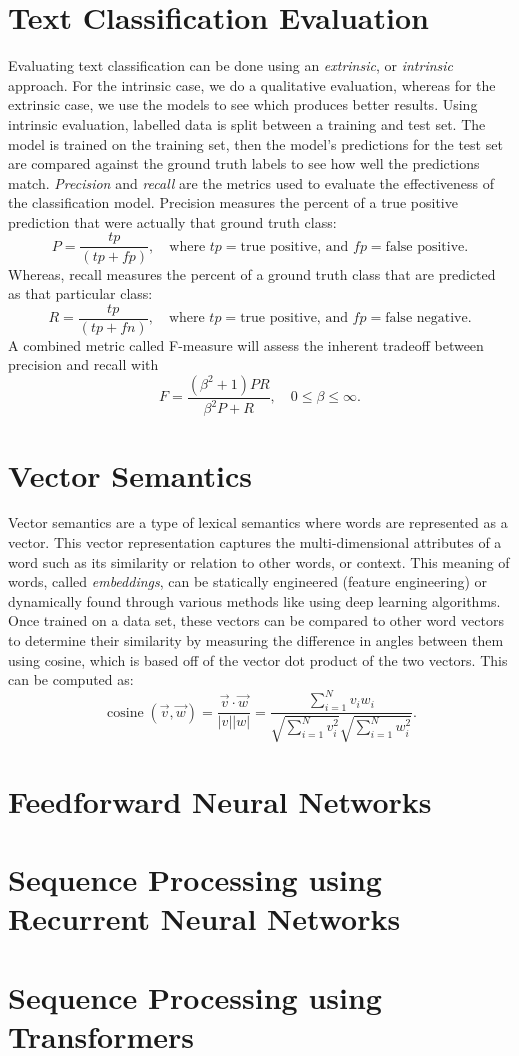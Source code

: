 \documentclass[12pt]{report}
\begin{document}
\section{Text Classification Evaluation}
Evaluating text classification can be done using an \emph{extrinsic}, or
\emph{intrinsic} approach.  For the intrinsic case, we do a
qualitative evaluation, whereas for the extrinsic case, we use the models to see
which produces better results.  Using intrinsic evaluation, labelled data is
split between a training and test set.  The model is trained on the training
set, then the model's predictions for the test set are compared against the
ground truth labels to see how well the predictions match.  \emph{Precision} and
\emph{recall} are the metrics used to evaluate the effectiveness of the
classification model.  Precision measures the percent of a true positive
prediction that were actually that ground truth class:
\[ P = \frac{tp}{(tp + fp)},\quad\text{where }tp = \text{true positive, and }fp
= \text{false positive}. \]
Whereas, recall measures the percent of a ground truth class that are predicted
as that particular class:
\[ R = \frac{tp}{(tp + fn)},\quad\text{where }tp = \text{true positive, and }fp
= \text{false negative}. \]
A combined metric called F-measure will assess the inherent tradeoff between
precision and recall with
\[ F = \frac{(\beta^2 + 1)PR}{\beta^2P + R},\quad 0\leq \beta\leq\infty. \]

\section{Vector Semantics}
Vector semantics are a type of lexical semantics where words are represented as
a vector.  This vector representation captures the multi-dimensional attributes
of a word such as its similarity or relation to other words, or context.  This
meaning of words, called \emph{embeddings}, can be statically engineered
(feature engineering) or dynamically found through various methods like using
deep learning algorithms.  Once trained on a data set, these vectors can be
compared to other word vectors to determine their similarity by measuring the
difference in angles between them using cosine, which is based off of the vector
dot product of the two vectors.  This can be computed as:
\[
  \operatorname*{cosine}(\vec{v}, \vec{w}) = \frac{\vec{v}\cdot\vec{w}}{\lvert v\rvert\lvert w\rvert}
  = \frac{\displaystyle\sum_{i = 1}^N v_iw_i}{\displaystyle\sqrt{\sum_{i = 1}^N v_i^2}\sqrt{\sum_{i = 1}^N w_i^2}}.
\]

\section{Feedforward Neural Networks}

\section{Sequence Processing using Recurrent Neural Networks}

\section{Sequence Processing using Transformers}
\end{document}
